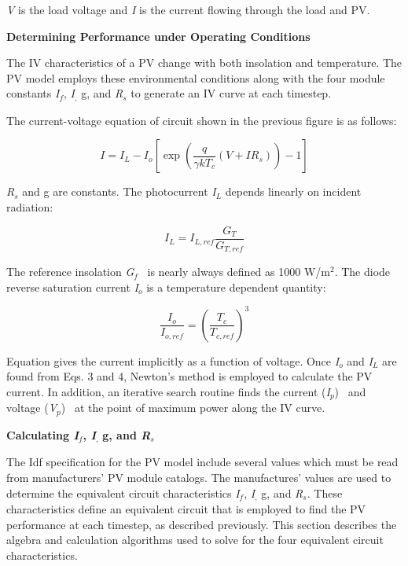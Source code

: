 \emph{V} is the load voltage and \emph{I} is the current flowing through the load and PV.

\textbf{Determining Performance under Operating Conditions}

The IV characteristics of a PV change with both insolation and temperature. The PV model employs these environmental conditions along with the four module constants \emph{I\(_{f}\)}, \emph{I\(_{,}\)} g, and \emph{R\(_{s}\)} to generate an IV curve at each timestep.

The current-voltage equation of circuit shown in the previous figure is as follows:

\begin{equation}
I = {I_L} - {I_o}\left[ {\exp \left( {\frac{q}{{\gamma k{T_c}}}\left( {V + I{R_s}} \right)} \right) - 1} \right]
\end{equation}

\emph{R\(_{s}\)} and g are constants. The photocurrent \emph{I\(_{L}\)} depends linearly on incident radiation:

\begin{equation}
{I_L} = {I_{L,ref}}\frac{{{G_T}}}{{{G_{T,ref}}}}
\end{equation}

The reference insolation \emph{G\(_{f}\)} ~is nearly always defined as 1000 W/m\(^{2}\). The diode reverse saturation current \emph{I\(_{o}\)} is a temperature dependent quantity:

\begin{equation}
\frac{{{I_o}}}{{{I_{o,ref}}}} = {\left( {\frac{{{T_c}}}{{{T_{c,ref}}}}} \right)^3}
\end{equation}

Equation gives the current implicitly as a function of voltage. Once \emph{I\(_{o}\)} and \emph{I\(_{L}\)} are found from Eqs. 3 and 4, Newton's method is employed to calculate the PV current. In addition, an iterative search routine finds the current (\emph{I\(_{p}\)}) ~and voltage (\emph{V\(_{p}\)})~ at the point of maximum power along the IV curve.

\textbf{Calculating \emph{I\(_{f}\)}, \emph{I\(_{,}\)}} \textbf{g, and \emph{R\(_{s}\)}}

The Idf specification for the PV model include several values which must be read from manufacturers' PV module catalogs. The manufactures' values are used to determine the equivalent circuit characteristics \emph{I\(_{f}\)}, \emph{I\(_{,}\)} g, and \emph{R\(_{s}\)}. These characteristics define an equivalent circuit that is employed to find the PV performance at each timestep, as described previously. This section describes the algebra and calculation algorithms used to solve for the four equivalent circuit characteristics.


